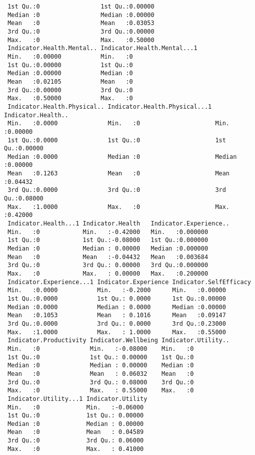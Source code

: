 \documentclass[11pt]{article}
\begin{document}
\begin{verbatim}
 1st Qu.:0                 1st Qu.:0.00000            
 Median :0                 Median :0.00000            
 Mean   :0                 Mean   :0.03053            
 3rd Qu.:0                 3rd Qu.:0.00000            
 Max.   :0                 Max.   :0.50000            
 Indicator.Health.Mental.. Indicator.Health.Mental...1
 Min.   :0.00000           Min.   :0                  
 1st Qu.:0.00000           1st Qu.:0                  
 Median :0.00000           Median :0                  
 Mean   :0.02105           Mean   :0                  
 3rd Qu.:0.00000           3rd Qu.:0                  
 Max.   :0.50000           Max.   :0                  
 Indicator.Health.Physical.. Indicator.Health.Physical...1 Indicator.Health..
 Min.   :0.0000              Min.   :0                     Min.   :0.00000   
 1st Qu.:0.0000              1st Qu.:0                     1st Qu.:0.00000   
 Median :0.0000              Median :0                     Median :0.00000   
 Mean   :0.1263              Mean   :0                     Mean   :0.04432   
 3rd Qu.:0.0000              3rd Qu.:0                     3rd Qu.:0.08000   
 Max.   :1.0000              Max.   :0                     Max.   :0.42000   
 Indicator.Health...1 Indicator.Health   Indicator.Experience..
 Min.   :0            Min.   :-0.42000   Min.   :0.000000      
 1st Qu.:0            1st Qu.:-0.08000   1st Qu.:0.000000      
 Median :0            Median : 0.00000   Median :0.000000      
 Mean   :0            Mean   :-0.04432   Mean   :0.003684      
 3rd Qu.:0            3rd Qu.: 0.00000   3rd Qu.:0.000000      
 Max.   :0            Max.   : 0.00000   Max.   :0.200000      
 Indicator.Experience...1 Indicator.Experience Indicator.SelfEfficacy
 Min.   :0.0000           Min.   :-0.2000      Min.   :0.00000       
 1st Qu.:0.0000           1st Qu.: 0.0000      1st Qu.:0.00000       
 Median :0.0000           Median : 0.0000      Median :0.00000       
 Mean   :0.1053           Mean   : 0.1016      Mean   :0.09147       
 3rd Qu.:0.0000           3rd Qu.: 0.0000      3rd Qu.:0.23000       
 Max.   :1.0000           Max.   : 1.0000      Max.   :0.55000       
 Indicator.Productivity Indicator.Wellbeing Indicator.Utility..
 Min.   :0              Min.   :-0.08000    Min.   :0          
 1st Qu.:0              1st Qu.: 0.00000    1st Qu.:0          
 Median :0              Median : 0.00000    Median :0          
 Mean   :0              Mean   : 0.06032    Mean   :0          
 3rd Qu.:0              3rd Qu.: 0.08000    3rd Qu.:0          
 Max.   :0              Max.   : 0.55000    Max.   :0          
 Indicator.Utility...1 Indicator.Utility 
 Min.   :0             Min.   :-0.06000  
 1st Qu.:0             1st Qu.: 0.00000  
 Median :0             Median : 0.00000  
 Mean   :0             Mean   : 0.04589  
 3rd Qu.:0             3rd Qu.: 0.06000  
 Max.   :0             Max.   : 0.41000  
    \end{verbatim}
\end{document}
